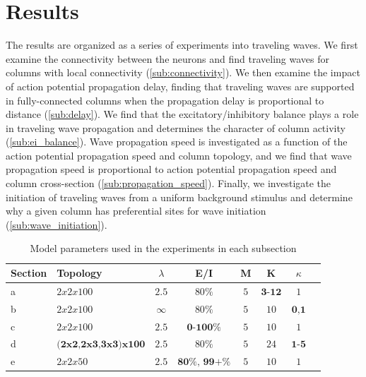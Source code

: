 \documentclass[a4paper,11pt]{article}
\begin{document}
\section{Results}
The results are organized as a series of experiments into traveling waves.
We first examine the connectivity between the neurons and find traveling waves for columns with local connectivity (\ref{sub:connectivity}).
We then examine the impact of action potential propagation delay, finding that traveling waves are supported in fully-connected columns when the propagation delay is proportional to distance (\ref{sub:delay}).
We find that the excitatory/inhibitory balance plays a role in traveling wave propagation and determines the character of column activity (\ref{sub:ei_balance}).
Wave propagation speed is investigated as a function of the action potential propagation speed and column topology, and we find that wave propagation speed is proportional to action potential propagation speed and column cross-section (\ref{sub:propagation_speed}).
Finally, we investigate the initiation of traveling waves from a uniform background stimulus and determine why a given column has preferential sites for wave initiation (\ref{sub:wave_initiation}).

\begin{table}[!htb]
 \caption{Model parameters used in the experiments in each subsection}
 \label{tab:experiment_params}
 \centering
 \begin{tabularx}{\textwidth}{l | X | c | c | c | c | c | r}
  \textbf{Section} & \textbf{Topology} & \textbf{$\lambda$} & \textbf{E/I} & \textbf{M} & \textbf{K} & \textbf{$\kappa$} \\
  \hline
  a & $2x2x100$ & $2.5$ & $80\%$ & $5$ & $\textbf{3-12}$ & $1$ \\ 
  b & $2x2x100$ & $\infty$ & $80\%$ & $5$ & $10$ & $\textbf{0,1}$ \\ 
  c & $2x2x100$ & $2.5$ & $\textbf{0-100}\%$ & $5$ & $10$ & $1$ \\ 
  d & $\textbf{(2x2,2x3,3x3)x100}$ & $2.5$ & $80\%$ & $5$ & $24$ & $\textbf{1-5}$ \\ 
  e & $2x2x50$ & $2.5$ & $\textbf{80\% , 99+\%}$ & $5$ & $10$ & $1$ \\ 
 \end{tabularx}
\end{table}

\FloatBarrier
\end{document}
